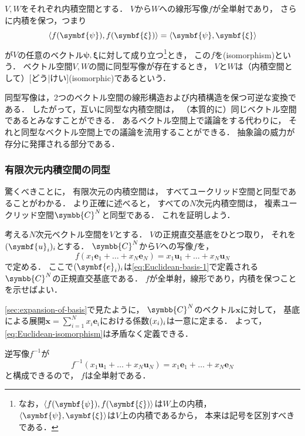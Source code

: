 \documentclass[
]{sotsu}
\newcommand{\bpsi}{\symbf{\psi}}
\newcommand{\bxi}{\symbf{\xi}}
\begin{document}
$V, W$をそれぞれ内積空間とする．
$V$から$W$への線形写像$f$が全単射であり，
さらに内積を保つ，つまり
\begin{equation*}
    \iparen{f(\bpsi), f(\bxi)} = \iparen{\bpsi, \bxi}
\end{equation*}
が$V$の任意のベクトル$\bpsi, \bxi$に対して成り立つ\footnote{
    なお，$\iparen{f(\bpsi), f(\bxi)}$は$W$上の内積，
    $\iparen{\bpsi, \bxi}$は$V$上の内積であるから，
    本来は記号を区別すべきである．
}とき，
この$f$を(isomorphism)という．
ベクトル空間$V, W$の間に同型写像が存在するとき，
$V$と$W$は（内積空間として）[どう|けい](isomorphic)であるという．

同型写像は，2つのベクトル空間の線形構造および内積構造を保つ可逆な変換である．
したがって，互いに同型な内積空間は，
（本質的に）同じベクトル空間であるとみなすことができる．
あるベクトル空間上で議論をする代わりに，
それと同型なベクトル空間上での議論を流用することができる．
抽象論の威力が存分に発揮される部分である．


\subsubsection{有限次元内積空間の同型}

\quad
驚くべきことに，
有限次元の内積空間は，
すべてユークリッド空間と同型であることがわかる．
より正確に述べると，
すべての$N$次元内積空間は，
複素ユークリッド空間$\symbb{C}^N$と同型である．
これを証明しよう．

考える$N$次元ベクトル空間を$V$とする．
$V$の正規直交基底をひとつ取り，
それを$\sequ{\symbf{u}_i}[i]$とする．
$\symbb{C}^N$から$V$への写像$f$を，
\begin{equation}
    \label{eq:Euclidean-isomorphism}
    f(x_1 \symbf{e}_1 + \dots + x_N \symbf{e}_N)
    = x_1 \symbf{u}_1 + \dots + x_N \symbf{u}_N
\end{equation}
で定める．
ここで$\sequ{\symbf{e}_i}[i]$は\cref{eq:Euclidean-basis-1}で定義される$\symbb{C}^N$の正規直交基底である．
$f$が全単射，線形であり，内積を保つことを示せばよい．

\quad
\cref{sec:expansion-of-basis}で見たように，
$\symbb{C}^N$のベクトル$\symbf{x}$に対して，
基底による展開$\symbf{x} = \sum_{i=1}^{N} x_i \symbf{e}_i$における係数$\sequ{x_i}[i]$は一意に定まる．
よって，\cref{eq:Euclidean-isomorphism}は矛盾なく定義できる．


\quad
% 
逆写像$f^{-1}$が
\begin{equation*}
    f^{-1} (x_1 \symbf{u}_1 + \dots + x_N \symbf{u}_N)
        = x_1 \symbf{e}_1 + \dots + x_N \symbf{e}_N
\end{equation*}
と構成できるので，
$f$は全単射である．
\end{document}
